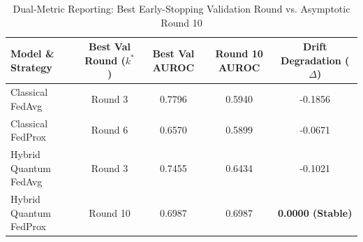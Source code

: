 \begin{table}[t]
\centering
\caption{Dual-Metric Reporting: Best Early-Stopping Validation Round vs. Asymptotic Round 10}
\label{tab:dual_metric_rounds}
\begin{tabular}{lcccc}
\hline
\textbf{Model \& Strategy} & \textbf{Best Val Round ($k^*$)} & \textbf{Best Val AUROC} & \textbf{Round 10 AUROC} & \textbf{Drift Degradation ($\Delta$)} \\
\hline
Classical FedAvg & Round 3 & 0.7796 & 0.5940 & -0.1856 \\
Classical FedProx & Round 6 & 0.6570 & 0.5899 & -0.0671 \\
Hybrid Quantum FedAvg & Round 3 & 0.7455 & 0.6434 & -0.1021 \\
Hybrid Quantum FedProx & Round 10 & 0.6987 & 0.6987 & \textbf{0.0000 (Stable)} \\
\hline
\end{tabular}
\end{table}
